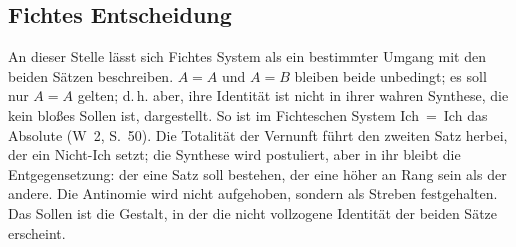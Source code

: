 \documentclass[11pt,a4paper]{article}
\newcommand{\Werke}[1]{(W~2, S.~#1)}
\begin{document}
\subsection{Fichtes Entscheidung}

An dieser Stelle lässt sich Fichtes System als ein bestimmter Umgang mit den beiden Sätzen beschreiben. \glqq $A = A$ und $A = B$ bleiben beide unbedingt; es soll nur $A = A$ gelten; d.\,h. aber, ihre Identität ist nicht in ihrer wahren Synthese, die kein bloßes Sollen ist, dargestellt. So ist im Fichteschen System Ich~=~Ich das Absolute\grqq{} \Werke{50}. Die Totalität der Vernunft führt den zweiten Satz herbei, der ein Nicht-Ich setzt; die Synthese wird postuliert, aber in ihr bleibt die Entgegensetzung: \glqq der eine Satz soll bestehen, der eine höher an Rang sein als der andere\grqq{}. Die Antinomie wird nicht aufgehoben, sondern als Streben festgehalten. Das Sollen ist die Gestalt, in der die nicht vollzogene Identität der beiden Sätze erscheint.
\end{document}
